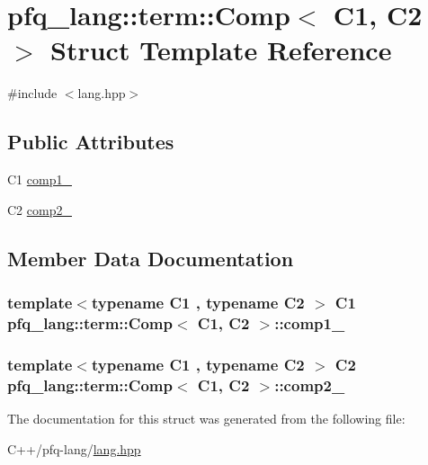 \hypertarget{structpfq__lang_1_1term_1_1Comp}{\section{pfq\-\_\-lang\-:\-:term\-:\-:Comp$<$ C1, C2 $>$ Struct Template Reference}
\label{structpfq__lang_1_1term_1_1Comp}
}


{\ttfamily \#include $<$lang.\-hpp$>$}

\subsection*{Public Attributes}
\begin{DoxyCompactItemize}
\item 
C1 \hyperlink{structpfq__lang_1_1term_1_1Comp_a627462a10b6c14fce82c8b2425d808ca}{comp1\-\_\-}
\item 
C2 \hyperlink{structpfq__lang_1_1term_1_1Comp_abedc337ebe11815017c547655d3e23ad}{comp2\-\_\-}
\end{DoxyCompactItemize}


\subsection{Member Data Documentation}
\hypertarget{structpfq__lang_1_1term_1_1Comp_a627462a10b6c14fce82c8b2425d808ca}{
\subsubsection[{comp1\-\_\-}]{\setlength{\rightskip}{0pt plus 5cm}template$<$typename C1 , typename C2 $>$ C1 {\bf pfq\-\_\-lang\-::term\-::\-Comp}$<$ C1, C2 $>$\-::comp1\-\_\-}}\label{structpfq__lang_1_1term_1_1Comp_a627462a10b6c14fce82c8b2425d808ca}
\hypertarget{structpfq__lang_1_1term_1_1Comp_abedc337ebe11815017c547655d3e23ad}{
\subsubsection[{comp2\-\_\-}]{\setlength{\rightskip}{0pt plus 5cm}template$<$typename C1 , typename C2 $>$ C2 {\bf pfq\-\_\-lang\-::term\-::\-Comp}$<$ C1, C2 $>$\-::comp2\-\_\-}}\label{structpfq__lang_1_1term_1_1Comp_abedc337ebe11815017c547655d3e23ad}


The documentation for this struct was generated from the following file\-:\begin{DoxyCompactItemize}
\item 
C++/pfq-\/lang/\hyperlink{lang_8hpp}{lang.\-hpp}\end{DoxyCompactItemize}
